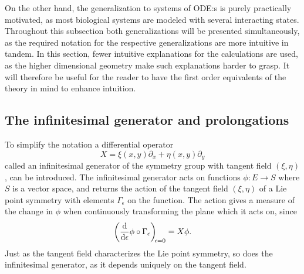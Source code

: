 On the other hand, the generalization to systems of ODE:s is purely practically motivated, as most biological systems are modeled with several interacting states.
Throughout this subsection both generalizations will be presented simultaneously, as the required notation for the respective generalizations are more intuitive in tandem.
In this section, fewer intuitive explanations for the calculations are used, as the higher dimensional geometry make such explanations harder to grasp.
It will therefore be useful for the reader to have the first order equivalents of the theory in mind to enhance intuition.

\subsection{The infinitesimal generator and prolongations}

To simplify the notation a differential operator
\begin{equation*}
  X = \xi(x,y) \partial_x + \eta(x,y) \partial_y
\end{equation*}
called an infinitesimal generator of the symmetry group with tangent field \(\left(\xi, \eta\right)\), can be introduced.
The infinitesimal generator acts on functions \(\phi: E \to S\) where \(S\) is a vector space, and returns the action of the tangent field \(\left(\xi, \eta\right)\) of a Lie point symmetry with elements \(\Gamma_\epsilon\) on the function.
The action gives a measure of the change in \(\phi\) when continuously transforming the plane which it acts on, since
\begin{equation*}
  \diff*{\phi \circ \Gamma_\epsilon}{\epsilon}[\epsilon = 0] = X \phi.
\end{equation*}
Just as the tangent field characterizes the Lie point symmetry, so does the infinitesimal generator, as it depends uniquely on the tangent field.

